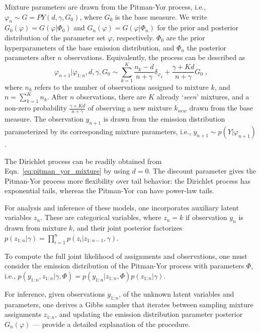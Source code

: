 \documentclass{article}
\newcommand{\ie}{i.e., }
\begin{document}
Mixture parameters are drawn from the Pitman-Yor process, \ie $\varphi_n \sim G=PY(d, \gamma, G_0)$, where $G_0$ is the base measure. We write $G_0(\varphi)=G(\varphi|\varPhi_0)$ and $G_n(\varphi)=G(\varphi|\varPhi_n)$ for the prior and posterior distribution of the parameter set $\varphi$, respectively. $\varPhi_0$ are the prior hyperparameters of the base emission distribution, and $\varPhi_n$ the posterior parameters after $n$ observations. Equivalently, the process can be described as 
\begin{equation}
\varphi_{n+1}|\varphi_{1:n}, d, \gamma, G_0 \sim \sum_{k=1}^{K} \frac{n_k-d}{n+\gamma}\delta_{\varphi_k} + \frac{\gamma+Kd}{n+\gamma}G_0 \; ,
\label{eq:pitman_yor_mixture}
\end{equation}
where $n_k$ refers to the number of observations assigned to mixture $k$, and $n=\sum_{k=1}^Kn_k$. After $n$ observations, there are $K$ already `\textit{seen}' mixtures, and a non-zero probability $\frac{\gamma+Kd}{n+\gamma}$ of observing a new mixture $k_{new}$ drawn from the base measure.
The observation $y_{n+1}$ is drawn from the emission distribution parameterized by its corresponding mixture parameters, \ie $y_{n+1} \sim p(Y|\varphi_{n+1})$.

The Dirichlet process can be readily obtained from Eqn.~\eqref{eq:pitman_yor_mixture} by using $d=0$. The discount parameter gives the Pitman-Yor process more flexibility over tail behavior: the Dirichlet process has exponential tails, whereas the Pitman-Yor can have power-law tails.

For analysis and inference of these models, one incorporates auxiliary latent variables $z_n$. These are categorical variables, where $z_{n}=k$ if observation $y_n$ is drawn from mixture $k$, and their joint posterior factorizes $p(z_{1:n}|\gamma) = \prod_{i=1}^n p(z_i|z_{1:n-1},\gamma)$.

To compute the full joint likelihood of assignments and observations, one must consider the emission distribution of the Pitman-Yor process with parameters $\varPhi$, \ie $p(y_{1:n},z_{1:n}|\gamma, \varPhi) = p(y_{1:n}|z_{1:n}, \varPhi) p(z_{1:n}|\gamma)$.

For inference, given observations $y_{1:n}$, of the unknown latent variables and parameters, one derives a Gibbs sampler that iterates between sampling mixture assignments $z_{1:n}$, and updating the emission distribution parameter posterior $G_n(\varphi)$ --- \citet{j-Teh2010} provide a detailed explanation of the procedure.
\end{document}
